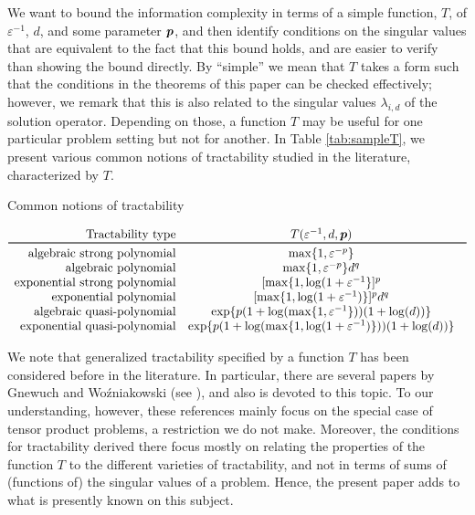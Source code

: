 \documentclass[sort&compress]{elsarticle}
\begin{document}
We want to bound the information complexity in terms of a simple function, $T$, of $\varepsilon^{-1}$, $d$, and some parameter $\boldsymbol{p}$, and then identify conditions on the singular values that are equivalent to the fact that this bound holds, and are easier to verify than showing the bound directly. By ``simple'' we mean that $T$ takes a form such that the conditions in the theorems of this paper can be checked effectively; however, we remark that this is also related to the singular values $\lambda_{i,d}$ of the solution operator. Depending on those, a function $T$ may be useful for one particular problem setting but not for another. In Table \ref{tab:sampleT}, we present various common notions of tractability studied in the literature, characterized by $T$. 
\begin{table}[hbt!]
    \caption{Common notions of tractability}
{\small
\begin{equation*}
	\begin{array}{r@{\quad}c@{\quad}cc}
		\text{Tractability type} & T(\varepsilon^{-1},d,\vp)
		\\
		\toprule
		\text{algebraic strong polynomial} & \max\{1,\varepsilon^{-p}\} \\
		\text{algebraic polynomial} & \max\{1,\varepsilon^{-p}\}d^{q} \\
		\text{exponential strong polynomial} &  [\max\{1,\log(1 + \varepsilon^{-1}\}]^p \\
		\text{exponential polynomial} &
		[\max\{1,\log(1 + \varepsilon^{-1})\}]^p  d^{q} \\
        \text{algebraic quasi-polynomial} &
        \exp\{p(1+\log(\max\{1, \varepsilon^{-1}\}))(1+\log(d))\} \\
        \text{exponential quasi-polynomial} &
        \exp\{p(1+\log(\max\{1,\log(1+\varepsilon^{-1})\}))(1+\log(d))\} 
	\end{array}
\end{equation*}}
\label{tab:sampleT}
\end{table}


We note that generalized tractability specified by a function $T$ has been considered before in the literature. In particular, there are several papers by Gnewuch and Wo\'{z}niakowski (see \cite{GW06,GW08,GW09,GneWoz11a}), and also \cite[Chapter 8]{NovWoz08a} is devoted to this topic. To our understanding, however, these references mainly focus on the special case of tensor product problems, a restriction we do not make.  Moreover, the conditions for tractability derived there focus mostly on relating the properties of the function $T$ to the different varieties of tractability, and not in terms of sums of (functions of) the singular values of a problem. Hence, the present paper adds to what is presently known on this subject. 
\end{document}
